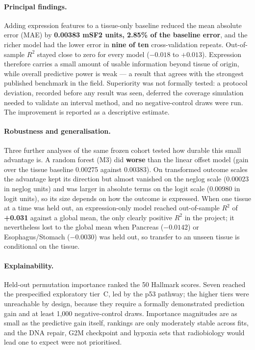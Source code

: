\paragraph{Principal findings.}
Adding expression features to a tissue-only baseline reduced the mean absolute error (MAE)
by \textbf{0.00383 mSF2 units, 2.85\% of the baseline error}, and the richer model had the
lower error in \textbf{nine of ten} cross-validation repeats. Out-of-sample $R^2$ stayed
close to zero for every model ($-0.018$ to $+0.013$). Expression therefore carries a small
amount of usable information beyond tissue of origin, while overall predictive power is
weak --- a result that agrees with the strongest published benchmark in the field.
Superiority was not formally tested: a protocol deviation, recorded before any result was
seen, deferred the coverage simulation needed to validate an interval method, and no
negative-control draws were run. The improvement is reported as a descriptive estimate.

\paragraph{Robustness and generalisation.}
Three further analyses of the same frozen cohort tested how durable this small advantage
is. A random forest (M3) did \textbf{worse} than the linear offset model (gain over the
tissue baseline 0.00275 against 0.00383). On transformed outcome scales the advantage kept
its direction but almost vanished on the neglog scale (0.00023 in neglog units) and was
larger in absolute terms on the logit scale (0.00980 in logit units), so its size depends on
how the outcome is expressed. When one tissue at a time was held out, an expression-only model
reached out-of-sample $R^2$ of \textbf{+0.031} against a global mean, the only clearly
positive $R^2$ in the project; it nevertheless lost to the global mean when Pancreas
($-0.0142$) or Esophagus/Stomach ($-0.0030$) was held out, so transfer to an unseen tissue
is conditional on the tissue.

\paragraph{Explainability.}
Held-out permutation importance ranked the 50 Hallmark scores. Seven reached the
prespecified exploratory tier~C, led by the p53 pathway; the higher tiers were unreachable
by design, because they require a formally demonstrated prediction gain and at least 1,000
negative-control draws. Importance magnitudes are as small as the predictive gain itself,
rankings are only moderately stable across fits, and the DNA repair, G2M checkpoint and
hypoxia sets that radiobiology would lead one to expect were not prioritised.

